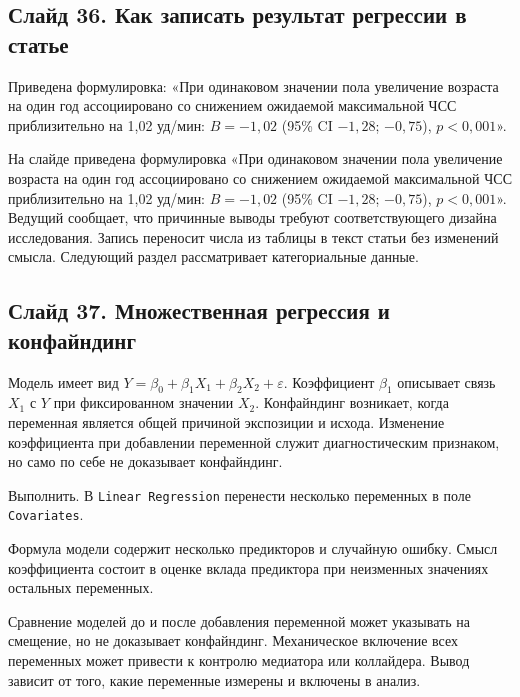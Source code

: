 \documentclass[11pt,a4paper]{article}
\begin{document}
\subsection*{Слайд 36. Как записать результат регрессии в статье}
\begin{onslide}
Приведена формулировка: «При одинаковом значении пола увеличение возраста на один год ассоциировано со снижением ожидаемой максимальной ЧСС приблизительно на 1,02 уд/мин: $B = -1{,}02$ (95\% CI $-1{,}28$; $-0{,}75$), $p < 0{,}001$».
\end{onslide}
На слайде приведена формулировка «При одинаковом значении пола увеличение возраста на один год ассоциировано со снижением ожидаемой максимальной ЧСС приблизительно на 1,02 уд/мин: $B = -1{,}02$ (95\% CI $-1{,}28$; $-0{,}75$), $p < 0{,}001$». Ведущий сообщает, что причинные выводы требуют соответствующего дизайна исследования. Запись переносит числа из таблицы в текст статьи без изменений смысла. Следующий раздел рассматривает категориальные данные.

\subsection*{Слайд 37. Множественная регрессия и конфайндинг}
\begin{onslide}
Модель имеет вид $Y=\beta_0+\beta_1X_1+\beta_2X_2+\varepsilon$. Коэффициент $\beta_1$ описывает связь $X_1$ с $Y$ при фиксированном значении $X_2$. Конфайндинг возникает, когда переменная является общей причиной экспозиции и исхода. Изменение коэффициента при добавлении переменной служит диагностическим признаком, но само по себе не доказывает конфайндинг.
\end{onslide}
\begin{jamovi}
Выполнить. В \texttt{Linear Regression} перенести несколько переменных в поле \texttt{Covariates}.\par Формула модели содержит несколько предикторов и случайную ошибку. Смысл коэффициента состоит в оценке вклада предиктора при неизменных значениях остальных переменных.
\end{jamovi}
Сравнение моделей до и после добавления переменной может указывать на смещение, но не доказывает конфайндинг. Механическое включение всех переменных может привести к контролю медиатора или коллайдера. Вывод зависит от того, какие переменные измерены и включены в анализ.
\end{document}
